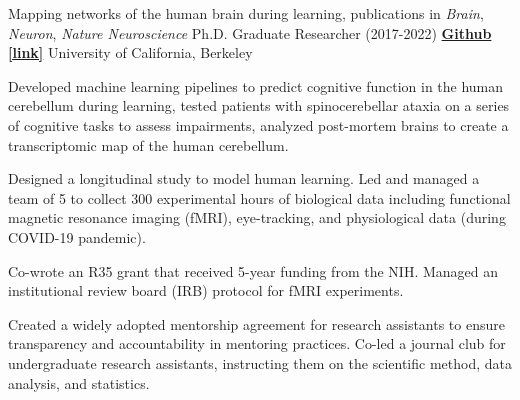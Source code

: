 
\begin{cventries}

  \cventry
    {Mapping networks of the human brain during learning, publications in \textit{Brain}, \textit{Neuron}, \textit{Nature Neuroscience}}
    {Ph.D. Graduate Researcher (2017-2022)} %
    {\href{https://github.com/maedbhk/cerebellum_learning_connect}{\textbf{Github [link]}}}
    {University of California, Berkeley} %
    {
      \begin{cvitems} %
        \item {Developed machine learning pipelines to predict cognitive function in the human cerebellum during learning, tested patients with spinocerebellar ataxia on a series of cognitive tasks to assess impairments, analyzed post-mortem brains to create a transcriptomic map of the human cerebellum.}
        \item {Designed a longitudinal study to model human learning. Led and managed a team of 5 to collect 300 experimental hours of biological data including functional magnetic resonance imaging (fMRI), eye-tracking, and physiological data (during COVID-19 pandemic).}
        \item {Co-wrote an R35 grant that received 5-year funding from the NIH. Managed an institutional review board (IRB) protocol for fMRI experiments.}
        \item {Created a widely adopted mentorship agreement for research assistants to ensure transparency and accountability in mentoring practices. Co-led a journal club for undergraduate research assistants, instructing them on the scientific method, data analysis, and statistics.}
      \end{cvitems}
    }
    

\end{cventries}
